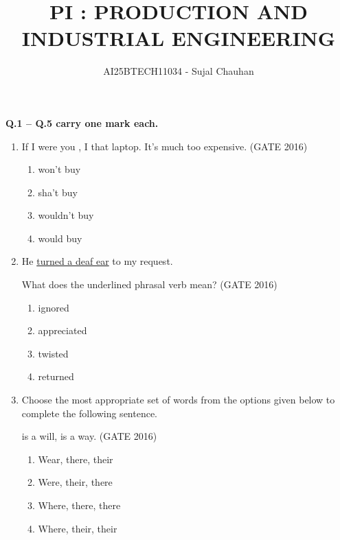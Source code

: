 \documentclass[journal,12pt,onecolumn]{IEEEtran}
\theoremstyle{remark}
\begin{document}
\title{PI : PRODUCTION AND INDUSTRIAL ENGINEERING}
\author{AI25BTECH11034 - Sujal Chauhan}
\maketitle
\renewcommand{\thefigure}{\theenumi}
\renewcommand{\thetable}{\theenumi}
\textbf{Q.1 -- Q.5 carry one mark each.}

\begin{enumerate}

\item If I were you , I \underline{\hspace{1.5cm}} that laptop. It's much too expensive.  
\hfill{(GATE 2016)}

\begin{enumerate}
    \item won't buy
    \item sha't buy
    \item wouldn't buy
    \item would buy
\end{enumerate}
\vspace{1cm}

\item He \underline{turned a deaf ear} to my request.  

What does the underlined phrasal verb mean?  
\hfill{(GATE 2016)}

\begin{enumerate}
    \item ignored
    \item appreciated
    \item twisted
    \item returned
\end{enumerate}
\vspace{1cm}

\item Choose the most appropriate set of words from the options given below to complete the following sentence.  

\underline{\hspace{1.5cm}} \underline{\hspace{1.5cm}} is a will, \underline{\hspace{1.5cm}} is a way.  
\hfill{(GATE 2016)}

\begin{enumerate}
    \item Wear, there, their
    \item Were, their, there
    \item Where, there, there
    \item Where, their, their
\end{enumerate}
\vspace{1cm}


\end{enumerate}
\end{document}
